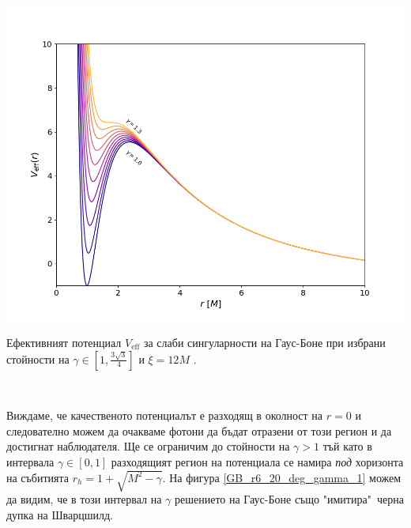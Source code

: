 \begin{minipage}{18em}
	\centering
	\includegraphics[scale = 0.3]{GB_eff_potential.png}
	\caption[Ефективният потенциал за слаби сингуларности на Гаус-Боне]{Ефективният потенциал $V_\text{eff}$ за слаби сингуларности на Гаус-Боне при избрани стойности на $\gamma\in\left[1, \frac{3\sqrt{3}}{4}\right]$ и $\xi = 12M$ \cite{Gyulchev2021}.}
	\label{GB_eff_pot}
\end{minipage}\,\,
\begin{minipage}{18em}
	Виждаме, че качественото потенциалът е разходящ в околност на $r = 0$ и следователно можем да очакваме фотони да бъдат отразени от този регион и да достигнат наблюдателя. Ще се ограничим до стойности на $\gamma > 1$ тъй като в интервала $\gamma \in \left[0,1\right]$ разходящият регион на потенциала се намира \emph{под} хоризонта на събитията $r_h = 1 +\sqrt{M^2 - \gamma}$. На фигура \ref{GB_r6_20_deg_gamma_1} можем да видим, че в този интервал на $\gamma$ решението на Гаус-Боне също "имитира"$\,$ черна дупка на Шварцшилд.
\end{minipage}
\newpage

